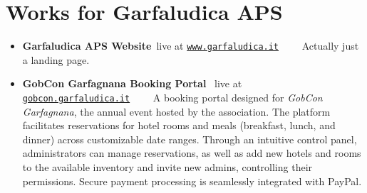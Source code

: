 \section*{Works for Garfaludica
APS\hfill{}}

\begin{itemize}
	\renewcommand{\labelitemi}{\color{accentcolor}\faArrowCircleRight}
	\setlength{\itemsep}{1em}
	\item \textbf{Garfaludica APS Website}\hfill{\color{black!70}\faGlobe~{\footnotesize live at}
		\href{https://www.garfaludica.it}{\texttt{www.garfaludica.it}}}~~~~\privatetag\newline
		{\color{black!70}\footnotesize Actually just a landing
		page.}\vspace{0.125cm}\newline
	\item \textbf{GobCon Garfagnana Booking Portal}\hfill{}\newline
		\phantom{x}\hfill{\color{black!70}\faGlobe~{\footnotesize live at}
		\href{https://gobcon.garfaludica.it}{\texttt{gobcon.garfaludica.it}}}~~~~\phantom{\opensourcetag}\newline
		{\color{black!70}\footnotesize A booking portal designed for
		\emph{GobCon Garfagnana}, the annual event hosted by the
		association. The platform facilitates reservations for hotel
		rooms and meals (breakfast, lunch, and dinner) across
		customizable date ranges. Through an intuitive control panel,
		administrators can manage reservations, as well as add new
		hotels and rooms to the available inventory and invite new
		admins, controlling their permissions. Secure payment
		processing is seamlessly integrated with
		PayPal.}\vspace{0.125cm}\newline

\end{itemize}
